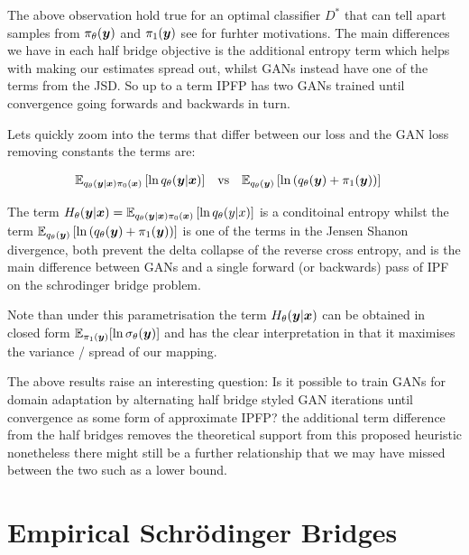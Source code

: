 \documentclass[a4paper,12pt,twoside,openright]{report}
\theoremstyle{definition}
\begin{document}
The above observation hold true for an optimal classifier $D^{*}$ that can tell apart samples from $\pi_\theta({\bm{y}})$ and $\pi_1({\bm{y}})$ see \cite{mohamed2016learning} for furhter motivations. The main differences we have in each half bridge objective is the additional entropy term which helps with making our estimates spread out, whilst GANs instead have one of the terms from the JSD.  So up to a term IPFP has two GANs trained until convergence going forwards and backwards in turn.

Lets quickly zoom into the terms that differ between our loss and the GAN loss removing constants the terms are:

\begin{align}
 \mathbb{E}_{q_{\theta}({\bm{y}}|{\bm{x}})\pi_0({\bm{x}})}\left[ \operatorname{ln} q_{\theta}({\bm{y}}|{\bm{x}}) \right]\quad &\text{vs} \quad  \mathbb{E}_{q_{\theta}({\bm{y}})}\left[\operatorname{ln}\left(q_{\theta}({\bm{y}}) + \pi_1({\bm{y}})\right)\right]
\end{align}

The term $H_{\theta}({\bm{y}}|{\bm{x}}) =\mathbb{E}_{q_{\theta}({\bm{y}}|{\bm{x}})\pi_0({\bm{x}})}\left[ \operatorname{ln} q_{\theta}(y|x) \right]$ is a conditoinal entropy whilst the term $\mathbb{E}_{q_{\theta}({\bm{y}})}\left[\operatorname{ln}\left(q_{\theta}({\bm{y}}) + \pi_1({\bm{y}})\right)\right]$ is one of the terms in the Jensen Shanon divergence, both prevent the delta collapse of the reverse cross entropy, and is the main difference between GANs and a single forward (or backwards) pass of IPF on the schrodinger bridge problem.

 Note than under this parametrisation the term $H_{\theta}({\bm{y}}|{\bm{x}})$ can be obtained in closed form $\mathbb{E}_{\pi_1({\bm{y}})}[\operatorname{ln} {\sigma}_{\theta}({\bm{y}})]$ and has the clear interpretation in that it maximises the variance / spread of our mapping.
 
 The above results raise an interesting question: Is it possible to train GANs for domain adaptation by alternating  half bridge styled GAN iterations until convergence as some form of approximate IPFP? the additional term difference from the half bridges removes the theoretical support from this proposed heuristic nonetheless there might still be a further relationship that we may have missed between the two such as a lower bound.



\chapter{Empirical Schrödinger Bridges}
\end{document}

